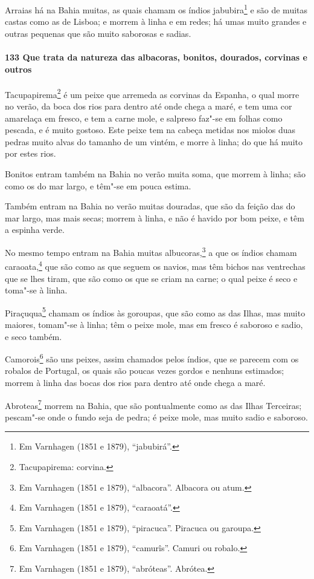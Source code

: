 Arraias há na Bahia muitas, as quais chamam os índios jabubira\footnote{ Em Varnhagen
(1851 e 1879), ``jabubirá''.} e são de muitas castas como as de Lisboa; e morrem à linha e
em redes; há umas muito grandes e outras pequenas que são muito saborosas e sadias.

\paragraph{133 Que trata da natureza das albacoras, bonitos, dourados, corvinas e outros}

Tacupapirema\footnote{ Tacupapirema: corvina.} é um peixe que arremeda as corvinas da
Espanha, o qual morre no verão, da boca dos rios para dentro até onde chega a maré, e tem
uma cor amarelaça em fresco, e tem a carne mole, e salpreso faz"-se em folhas como pescada,
e é muito gostoso. Este peixe tem na cabeça metidas nos miolos duas pedras muito alvas do
tamanho de um vintém, e morre à linha; do que há muito por estes rios.

Bonitos entram também na Bahia no verão muita soma, que morrem à linha; são como os do mar
largo, e têm"-se em pouca estima.

Também entram na Bahia no verão muitas douradas, que são da feição das do mar largo, mas
mais secas; morrem à linha, e não é havido por bom peixe, e têm a espinha verde.

No mesmo tempo entram na Bahia muitas albucoras,\footnote{ Em Varnhagen (1851 e 1879),
``albacora''. Albacora ou atum.} a que os índios chamam caraoata,\footnote{ Em Varnhagen
(1851 e 1879), ``caraoatá''.} que são como as que seguem os navios, mas têm bichos nas
ventrechas que se lhes tiram, que são como os que se criam na carne; o qual peixe é seco e
toma"-se à linha.

Piraçuqua\footnote{ Em Varnhagen (1851 e 1879), ``piracuca''. Piracuca ou garoupa.} chamam
os índios às goroupas, que são como as das Ilhas, mas muito maiores, tomam"-se à linha; têm
o peixe mole, mas em fresco é saboroso e sadio, e seco também.

Camorois\footnote{ Em Varnhagen (1851 e 1879), ``camurîs''. Camuri ou robalo.} são uns
peixes, assim chamados pelos índios, que se parecem com os robalos de Portugal, os quais
são poucas vezes gordos e nenhuns estimados; morrem à linha das bocas dos rios para dentro
até onde chega a maré.

Abroteas\footnote{ Em Varnhagen (1851 e 1879), ``abróteas''. Abrótea.} morrem na Bahia,
que são pontualmente como as das Ilhas Terceiras; pescam"-se onde o fundo seja de pedra; é
peixe mole, mas muito sadio e saboroso.

